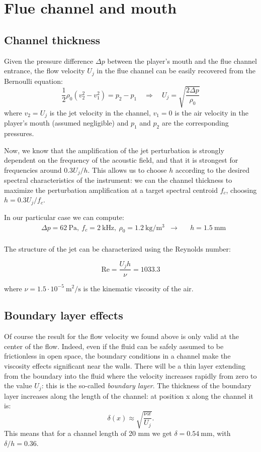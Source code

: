 \documentclass[a4paper]{article}
\begin{document}
\section{Flue channel and mouth}
\subsection{Channel thickness}

Given the pressure difference $\Delta p$ between the player's mouth and the flue channel entrance, the flow velocity $U_j$ in the flue channel can be easily recovered from the Bernoulli equation:
\[
	\frac{1}{2} \rho_0 \left( v_2^2 - v_1^2 \right) = p_2 - p_1 \quad \Rightarrow \quad
	U_j = \sqrt{\frac{2\Delta p}{\rho_0}}
\]
where $v_2 = U_j$ is the jet velocity in the channel, $v_1 = 0$ is the air velocity in the player's mouth (assumed negligible) and $p_1$ and $p_2$ are the corresponding pressures.

Now, we know that the amplification of the jet perturbation is strongly dependent on the frequency of the acoustic field, and that it is strongest for frequencies around $0.3U_j / h$. This allows us to choose $h$ according to the desired spectral characteristics of the instrument: we can  the channel thickness to maximize the perturbation amplification at a target spectral centroid $f_c$, choosing $ h = 0.3 U_j / f_c$.

In our particular case we can compute:
\begin{align*}
		&\Delta p = \SI{62}{\pascal},~ f_c = \SI{2}{\kilo\hertz},~ \rho_0 = \SI{1.2}{\kilogram\per\meter\cubed} &\longrightarrow \quad &\boxed{h = \SI{1.5}{\milli\metre}}\\
\end{align*}

The structure of the jet can be characterized using the Reynolds number:

$$ \mathrm{Re} = \frac{U_j h}{\nu} = 1033.3 $$

where $\nu = 1.5 \cdot 10^{-5}~ \si{\meter\squared\per\second}$ is the kinematic viscosity of the air.

\subsection{Boundary layer effects}
Of course the result for the flow velocity we found above is only valid at the center of the flow. Indeed, even if the fluid can be safely assumed to be frictionless in open space, the boundary conditions in a channel make the viscosity effects significant near the walls. There will be a thin layer extending from the boundary into the fluid where the velocity increases rapidly from zero to the value $U_j$: this is the so-called \emph{boundary layer}. The thickness of the boundary layer increases along the length of the channel: at position x along the channel it is:
$$ \delta(x) \approx \sqrt{\frac{\nu x}{U_j}}. $$
This means that for a channel length of 20 mm we get $\delta = \SI{0.54}{\milli\meter}$, with $\delta/h = 0.36$.
\end{document}
